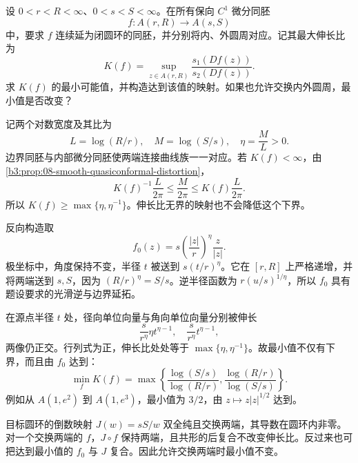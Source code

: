 \begin{exercise}\label{b3:ex:08-2}
设 \(0<r<R<\infty\)、\(0<s<S<\infty\)。在所有保向 \(C^1\) 微分同胚
\[
 f:A(r,R)\longrightarrow A(s,S)
\]
中，要求 \(f\) 连续延为闭圆环的同胚，并分别将内、外圆周对应。记其最大伸长比为
\[
 K(f)=\sup_{z\in A(r,R)}\frac{s_1(Df(z))}{s_2(Df(z))}.
\]
求 \(K(f)\) 的最小可能值，并构造达到该值的映射。如果也允许交换内外圆周，最小值是否改变？
\end{exercise}
\begin{solution}
记两个对数宽度及其比为
\[
 L=\log(R/r),\quad M=\log(S/s),\quad\eta=\frac ML>0.
\]
边界同胚与内部微分同胚使两端连接曲线族一一对应。若 \(K(f)<\infty\)，由\cref{b3:prop:08-smooth-quasiconformal-distortion}，
\[
 K(f)^{-1}\frac{L}{2\pi}
 \le\frac{M}{2\pi}
 \le K(f)\frac{L}{2\pi}.
\]
所以 \(K(f)\ge\max\{\eta,\eta^{-1}\}\)。伸长比无界的映射也不会降低这个下界。

反向构造取
\[
 f_0(z)=s\left(\frac{|z|}{r}\right)^\eta\frac z{|z|}.
\]
极坐标中，角度保持不变，半径 \(t\) 被送到
\(s(t/r)^\eta\)。它在 \([r,R]\) 上严格递增，并将两端送到 \(s,S\)，因为 \((R/r)^\eta=S/s\)。逆半径函数为 \(r(u/s)^{1/\eta}\)，所以 \(f_0\) 具有题设要求的光滑逆与边界延拓。

在源点半径 \(t\) 处，径向单位向量与角向单位向量分别被伸长
\[
 \frac{s}{r^\eta}\eta t^{\eta-1},\quad
 \frac{s}{r^\eta}t^{\eta-1},
\]
两像仍正交。行列式为正，伸长比处处等于 \(\max\{\eta,\eta^{-1}\}\)。故最小值不仅有下界，而且由 \(f_0\) 达到：
\[
 \min_f K(f)=
 \max\left\{\frac{\log(S/s)}{\log(R/r)},
             \frac{\log(R/r)}{\log(S/s)}\right\}.
\]
例如从 \(A(1,e^2)\) 到 \(A(1,e^3)\)，最小值为 \(3/2\)，由 \(z\mapsto z|z|^{1/2}\) 达到。

目标圆环的倒数映射 \(J(w)=sS/w\) 双全纯且交换两端，其导数在圆环内非零。对一个交换两端的 \(f\)，\(J\circ f\) 保持两端，且共形的后复合不改变伸长比。反过来也可把达到最小值的 \(f_0\) 与 \(J\) 复合。因此允许交换两端时最小值不变。
\end{solution}


